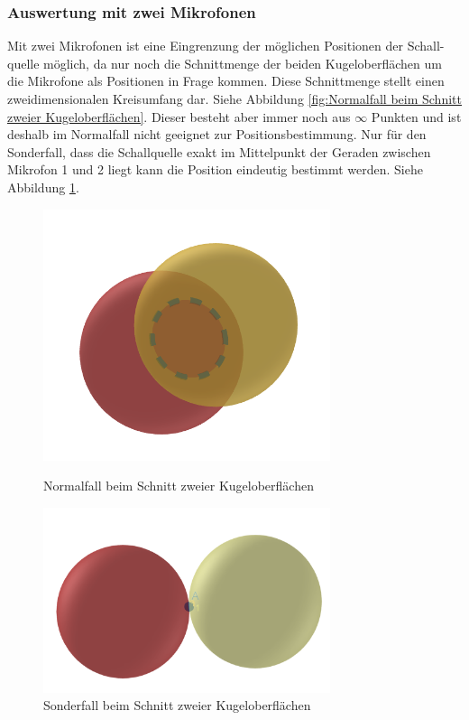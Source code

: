 \subsubsection{Auswertung mit zwei Mikrofonen}
Mit zwei Mikrofonen ist eine Eingrenzung der möglichen Positionen der Schall-quelle möglich, da nur noch die Schnittmenge der beiden Kugeloberflächen um die Mikrofone als Positionen in Frage kommen. Diese Schnittmenge stellt einen zweidimensionalen Kreisumfang dar. Siehe Abbildung \ref{fig:Normalfall beim Schnitt zweier Kugeloberflächen}. Dieser besteht aber immer noch aus $\infty$ Punkten und ist deshalb im Normalfall nicht geeignet zur Positionsbestimmung. Nur für den Sonderfall, dass die Schallquelle exakt im Mittelpunkt der Geraden zwischen Mikrofon 1 und 2 liegt kann die Position eindeutig bestimmt werden. Siehe Abbildung \ref{fig:Sonderfall beim Schnitt zweier Kugeloberflächen}.
\begin{figure}[b]
	\centering
	\begin{minipage}[t]{0.45\linewidth}
		\centering
		\includegraphics[width=0.75\textwidth]{Schnitt_2_Kugeln}
		\caption{Normalfall beim Schnitt zweier Kugeloberflächen}\label{fig:Normalfall beim Schnitt zweier Kugeloberflächen}		
	\end{minipage}
	\hfill
	\begin{minipage}[t]{0.45\linewidth}
		\centering
		\includegraphics[width=0.75\textwidth]{2KugelnSonderfall}
		\caption{Sonderfall beim Schnitt zweier Kugeloberflächen}\label{fig:Sonderfall beim Schnitt zweier Kugeloberflächen}
	\end{minipage}
\end{figure}

